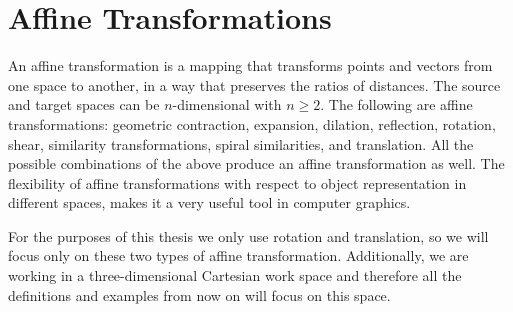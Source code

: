 \section{Affine Transformations}
\label{sec:affine}
An affine transformation is a mapping that transforms points and vectors from one space to another, in a way that preserves the ratios of distances. The source and target spaces can be $n$-dimensional with $n\ge2$. The following are affine transformations: geometric contraction, expansion, dilation, reflection, rotation, shear, similarity transformations, spiral similarities, and translation. All the possible combinations of the above produce an affine transformation as well. The flexibility of affine transformations with respect to object representation in different spaces, makes it a very useful tool in computer graphics.

For the purposes of this thesis we only use rotation and translation, so we will focus only on these two types of affine transformation. Additionally, we are working in a three-dimensional Cartesian work space and therefore all the definitions and examples from now on will focus on this space.


